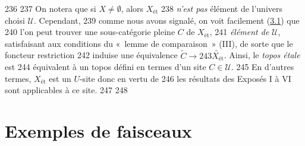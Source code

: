    236	
   237	On notera que si $X \neq ∅$, alors $X_{\text{ét}}$
   238	\emph{n'est pas} élément de l'univers choisi $𝒰$. Cependant,
   239	comme nous avons signalé, on voit facilement (\hyperref[VII.prop3.1]{3.1}) que
   240	l'on peut trouver une sous-catégorie pleine $C$ de $X_{\text{ét}}$,
   241	\emph{élément de} $𝒰$, satisfaisant aux conditions du « lemme de comparaison » (III), de sorte que le foncteur restriction
   242	induise une équivalence $\widetilde{C} \to
   243	\widetilde{X_{\text{ét}}}$. Ainsi, le \emph{topos étale} est
   244	équivalent à un topos défini en termes d'un site $C \in 𝒰$.
   245	En d'autres termes, $X_{\text{ét}}$ est un $U$-site donc en vertu de
   246	\loccit les résultats des Exposés I à VI sont applicables à ce site.
   247	
   248	\section{Exemples de faisceaux}	
